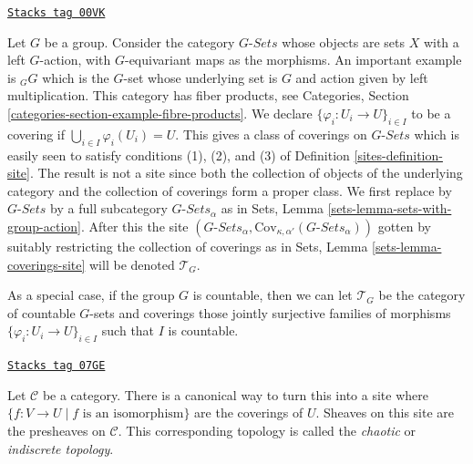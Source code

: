 \begin{example}
\label{sites-example-site-on-group}
\href{https://stacks.math.columbia.edu/tag/00VK}{\texttt{Stacks tag 00VK}}

Let $G$ be a group. Consider the category $G\textit{-Sets}$
whose objects are sets $X$ with a left $G$-action, with
$G$-equivariant maps as the morphisms. An important example
is ${}_GG$ which is the $G$-set whose underlying set is $G$ and
action given by left multiplication. This category has
fiber products, see Categories, Section
\ref{categories-section-example-fibre-products}.
We declare $\{\varphi_i : U_i \to U\}_{i\in I}$ to be
a covering if $\bigcup_{i\in I} \varphi_i(U_i) = U$.
This gives a class of coverings on $G\textit{-Sets}$
which is easily seen to satisfy conditions (1), (2), and (3)
of Definition \ref{sites-definition-site}. The result is not a
site since both the collection of objects of the underlying category and
the collection of coverings form a proper class.
We first replace by $G\textit{-Sets}$ by a
full subcategory $G\textit{-Sets}_\alpha$ as in Sets,
Lemma \ref{sets-lemma-sets-with-group-action}.
After this the site
$(G\textit{-Sets}_\alpha,
\text{Cov}_{\kappa, \alpha'}(G\textit{-Sets}_\alpha))$
gotten by suitably restricting the collection of coverings
as in Sets, Lemma \ref{sets-lemma-coverings-site} will be
denoted $\mathcal{T}_G$.

\medskip\noindent
As a special case, if the group $G$ is countable, then we can let
$\mathcal{T}_G$ be the category of countable $G$-sets and coverings
those jointly surjective families of morphisms
$\{\varphi_i : U_i \to U\}_{i \in I}$ such that $I$ is countable.
\end{example}

\begin{example}[Indiscrete]
\label{sites-example-indiscrete}
\href{https://stacks.math.columbia.edu/tag/07GE}{\texttt{Stacks tag 07GE}}

Let $\mathcal{C}$ be a category. There is a canonical way to turn this
into a site where $\{f : V \to U \mid f\text{ is an isomorphism}\}$
are the coverings of $U$.
Sheaves on this site are the presheaves on $\mathcal{C}$.
This corresponding topology is called the {\it chaotic} or
{\it indiscrete topology}.
\end{example}

